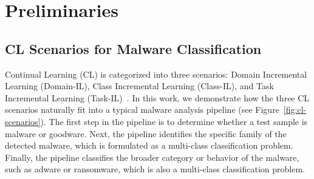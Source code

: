\section{Preliminaries}
\label{preliminaries}

\subsection{CL Scenarios for Malware Classification}


Continual Learning (CL) is categorized into three scenarios: Domain Incremental Learning (Domain-IL), Class Incremental Learning (Class-IL), and Task Incremental Learning (Task-IL)~\cite{van2022three}. In this work, we demonstrate how the  three CL scenarios naturally fit into a typical malware analysis pipeline (see Figure~\ref{fig:cl-scenarios}). The first step in the pipeline is to determine whether a test sample is malware or goodware. Next, the pipeline identifies the specific family of the detected malware, which is formulated as a multi-class classification problem. Finally, the pipeline classifies the broader category or behavior of the malware, such as adware or ransomware, which is also a multi-class classification problem. 
 


